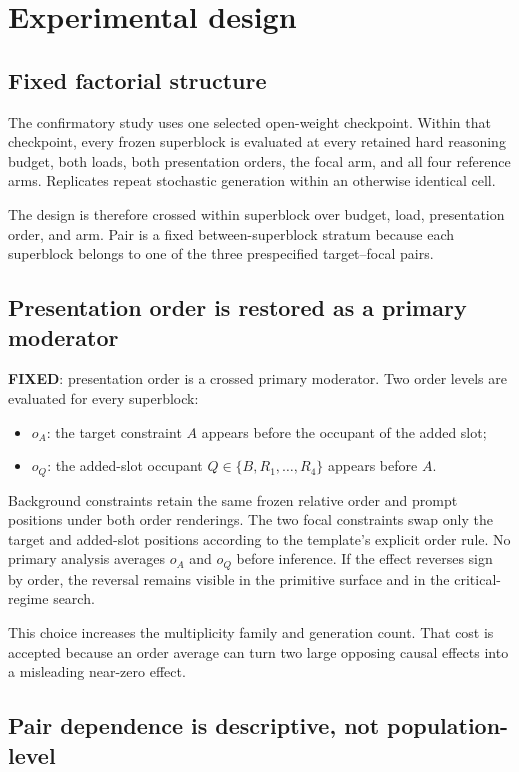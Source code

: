 \documentclass[11pt,a4paper]{article}
\newcommand{\FIXED}{\textbf{FIXED}}
\begin{document}
\section{Experimental design}

\subsection{Fixed factorial structure}

The confirmatory study uses one selected open-weight checkpoint. Within that checkpoint, every frozen superblock is evaluated at every retained hard reasoning budget, both loads, both presentation orders, the focal arm, and all four reference arms. Replicates repeat stochastic generation within an otherwise identical cell.

The design is therefore crossed within superblock over budget, load, presentation order, and arm. Pair is a fixed between-superblock stratum because each superblock belongs to one of the three prespecified target--focal pairs.

\subsection{Presentation order is restored as a primary moderator}

\FIXED: presentation order is a crossed primary moderator. Two order levels are evaluated for every superblock:
\begin{itemize}
\item $o_A$: the target constraint $A$ appears before the occupant of the added slot;
\item $o_Q$: the added-slot occupant $Q\in\{B,R_1,\ldots,R_4\}$ appears before $A$.
\end{itemize}

Background constraints retain the same frozen relative order and prompt positions under both order renderings. The two focal constraints swap only the target and added-slot positions according to the template's explicit order rule. No primary analysis averages $o_A$ and $o_Q$ before inference. If the effect reverses sign by order, the reversal remains visible in the primitive surface and in the critical-regime search.

This choice increases the multiplicity family and generation count. That cost is accepted because an order average can turn two large opposing causal effects into a misleading near-zero effect.

\subsection{Pair dependence is descriptive, not population-level}
\end{document}
